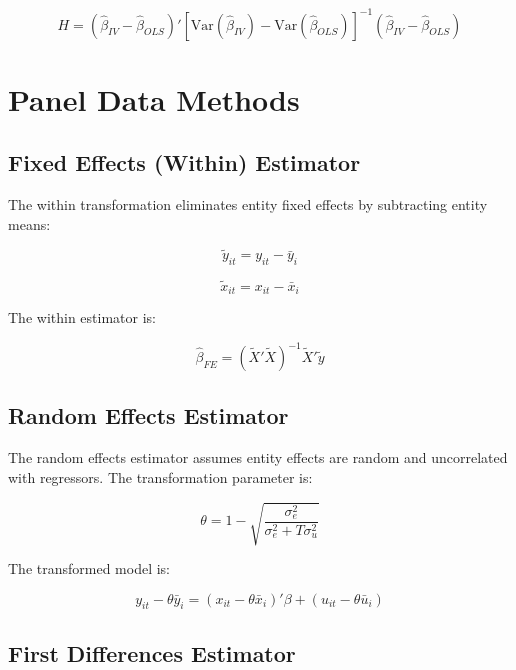 \documentclass[11pt]{article}
\begin{document}
\begin{equation}
H = (\hat{\beta}_{IV} - \hat{\beta}_{OLS})'[\text{Var}(\hat{\beta}_{IV}) - \text{Var}(\hat{\beta}_{OLS})]^{-1}(\hat{\beta}_{IV} - \hat{\beta}_{OLS})
\end{equation}

\section{Panel Data Methods}

\subsection{Fixed Effects (Within) Estimator}

The within transformation eliminates entity fixed effects by subtracting entity means:

\begin{equation}
\tilde{y}_{it} = y_{it} - \bar{y}_i
\end{equation}

\begin{equation}
\tilde{x}_{it} = x_{it} - \bar{x}_i
\end{equation}

The within estimator is:

\begin{equation}
\hat{\beta}_{FE} = (\tilde{X}'\tilde{X})^{-1}\tilde{X}'\tilde{y}
\end{equation}

\subsection{Random Effects Estimator}

The random effects estimator assumes entity effects are random and uncorrelated with regressors. The transformation parameter is:

\begin{equation}
\theta = 1 - \sqrt{\frac{\sigma_e^2}{\sigma_e^2 + T\sigma_u^2}}
\end{equation}

The transformed model is:

\begin{equation}
y_{it} - \theta\bar{y}_i = (x_{it} - \theta\bar{x}_i)'\beta + (u_{it} - \theta\bar{u}_i)
\end{equation}

\subsection{First Differences Estimator}
\end{document}

